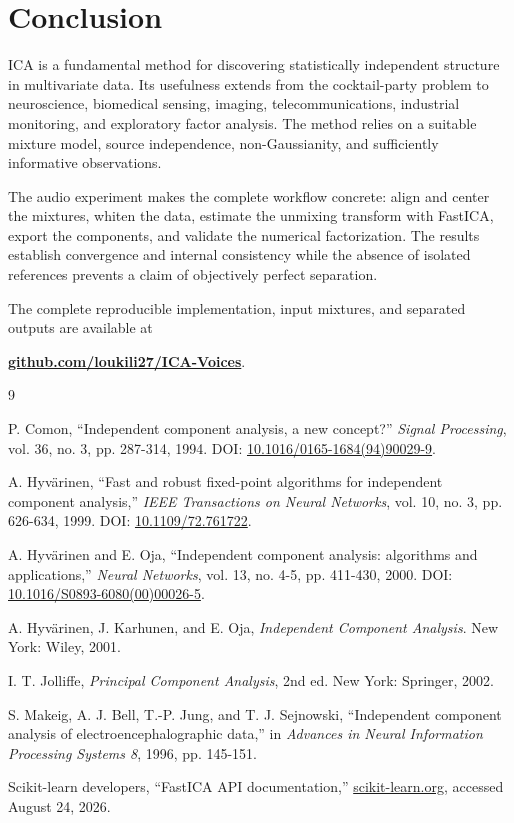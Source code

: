 \documentclass[
    paper=a4,
    fontsize=11pt,
    DIV=11,
    parskip=half,
    headings=normal,
    numbers=noendperiod,
    abstract=true,
    titlepage=true
]{scrartcl}
\begin{document}
\section{Conclusion}

ICA is a fundamental method for discovering statistically independent structure in multivariate data. Its usefulness extends from the cocktail-party problem to neuroscience, biomedical sensing, imaging, telecommunications, industrial monitoring, and exploratory factor analysis. The method relies on a suitable mixture model, source independence, non-Gaussianity, and sufficiently informative observations.

The audio experiment makes the complete workflow concrete: align and center the mixtures, whiten the data, estimate the unmixing transform with FastICA, export the components, and validate the numerical factorization. The results establish convergence and internal consistency while the absence of isolated references prevents a claim of objectively perfect separation.

The complete reproducible implementation, input mixtures, and separated outputs are available at
\begin{center}
    \href{https://github.com/loukili27/ICA-Voices}{\textbf{github.com/loukili27/ICA-Voices}}.
\end{center}

\begin{thebibliography}{9}

P. Comon, ``Independent component analysis, a new concept?'' \emph{Signal Processing}, vol. 36, no. 3, pp. 287-314, 1994. DOI: \href{https://doi.org/10.1016/0165-1684(94)90029-9}{10.1016/0165-1684(94)90029-9}.

A. Hyv\"arinen, ``Fast and robust fixed-point algorithms for independent component analysis,'' \emph{IEEE Transactions on Neural Networks}, vol. 10, no. 3, pp. 626-634, 1999. DOI: \href{https://doi.org/10.1109/72.761722}{10.1109/72.761722}.

A. Hyv\"arinen and E. Oja, ``Independent component analysis: algorithms and applications,'' \emph{Neural Networks}, vol. 13, no. 4-5, pp. 411-430, 2000. DOI: \href{https://doi.org/10.1016/S0893-6080(00)00026-5}{10.1016/S0893-6080(00)00026-5}.

A. Hyv\"arinen, J. Karhunen, and E. Oja, \emph{Independent Component Analysis}. New York: Wiley, 2001.

I. T. Jolliffe, \emph{Principal Component Analysis}, 2nd ed. New York: Springer, 2002.

S. Makeig, A. J. Bell, T.-P. Jung, and T. J. Sejnowski, ``Independent component analysis of electroencephalographic data,'' in \emph{Advances in Neural Information Processing Systems 8}, 1996, pp. 145-151.

Scikit-learn developers, ``FastICA API documentation,'' \href{https://scikit-learn.org/stable/modules/generated/sklearn.decomposition.FastICA.html}{scikit-learn.org}, accessed August 24, 2026.

\end{thebibliography}
\end{document}

